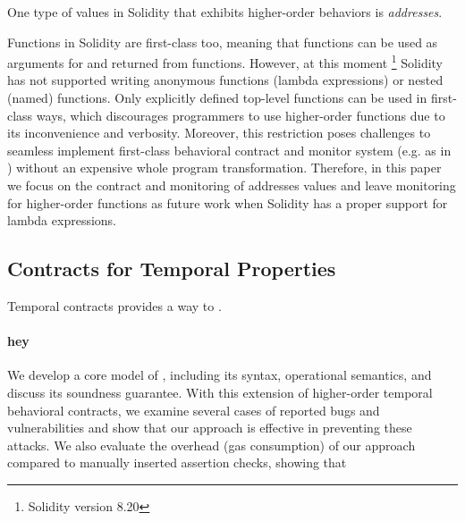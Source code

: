 One type of values in Solidity that exhibits higher-order behaviors is \emph{addresses}.

Functions in Solidity are first-class too, meaning that functions can be used as
arguments for and returned from functions. However, at this moment
\footnote{Solidity version 8.20} Solidity has not supported writing anonymous
functions (lambda expressions) or nested (named) functions.
Only explicitly defined top-level functions can be used in first-class ways,
which discourages programmers to use higher-order functions due to its
inconvenience and verbosity.
Moreover, this restriction poses challenges to seamless implement first-class
behavioral contract and monitor system (e.g. as in \cite{DBLP:conf/icfp/FindlerF02})
without an expensive whole program transformation.
Therefore, in this paper we focus on the contract and monitoring of addresses values
and leave monitoring for higher-order functions as future work when
Solidity has a proper support for lambda expressions.


\subsection*{\textbf{Contracts for Temporal Properties}}

Temporal contracts provides a way to .

\paragraph{hey}

We develop a core model of \lang, including its syntax, operational semantics,
and discuss its soundness guarantee.
With this extension of higher-order temporal behavioral contracts, we examine
several cases of reported bugs and vulnerabilities and show that
our approach is effective in preventing these attacks.
We also evaluate the overhead (gas consumption) of our approach
compared to manually inserted assertion checks, showing that 




